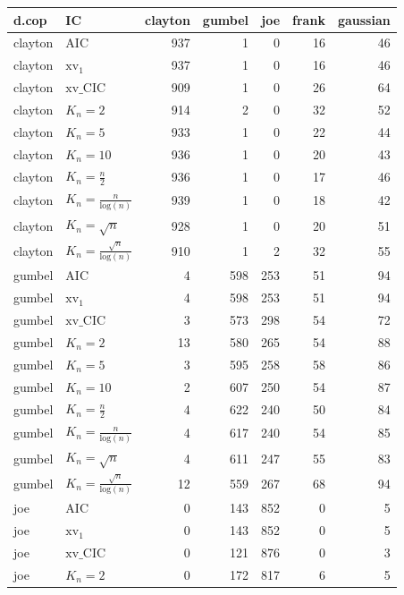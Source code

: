 \begin{table}[htbp]
\centering
\begin{tabular}{llrrrrr}
  \hline
d.cop & IC & clayton & gumbel & joe & frank & gaussian \\ 
  \hline
clayton & AIC & 937 & 1 & 0 & 16 & 46 \\ 
  clayton & $\text{xv}_{1}$ & 937 & 1 & 0 & 16 & 46 \\ 
  clayton & $\text{xv}\_\text{CIC}$ & 909 & 1 & 0 & 26 & 64 \\ 
  clayton & $K_{n}=2$ & 914 & 2 & 0 & 32 & 52 \\ 
  clayton & $K_{n}=5$ & 933 & 1 & 0 & 22 & 44 \\ 
  clayton & $K_{n}=10$ & 936 & 1 & 0 & 20 & 43 \\ 
  clayton & $K_{n}=\tfrac{n}{2}$ & 936 & 1 & 0 & 17 & 46 \\ 
  clayton & $K_{n}=\tfrac{n}{\text{log}(n)}$ & 939 & 1 & 0 & 18 & 42 \\ 
  clayton & $K_{n}=\sqrt{n}$ & 928 & 1 & 0 & 20 & 51 \\ 
  clayton & $K_{n}=\tfrac{\sqrt{n}}{\text{log}(n)}$ & 910 & 1 & 2 & 32 & 55 \\ 
   \hdashline
gumbel & AIC & 4 & 598 & 253 & 51 & 94 \\ 
  gumbel & $\text{xv}_{1}$ & 4 & 598 & 253 & 51 & 94 \\ 
  gumbel & $\text{xv}\_\text{CIC}$ & 3 & 573 & 298 & 54 & 72 \\ 
  gumbel & $K_{n}=2$ & 13 & 580 & 265 & 54 & 88 \\ 
  gumbel & $K_{n}=5$ & 3 & 595 & 258 & 58 & 86 \\ 
  gumbel & $K_{n}=10$ & 2 & 607 & 250 & 54 & 87 \\ 
  gumbel & $K_{n}=\tfrac{n}{2}$ & 4 & 622 & 240 & 50 & 84 \\ 
  gumbel & $K_{n}=\tfrac{n}{\text{log}(n)}$ & 4 & 617 & 240 & 54 & 85 \\ 
  gumbel & $K_{n}=\sqrt{n}$ & 4 & 611 & 247 & 55 & 83 \\ 
  gumbel & $K_{n}=\tfrac{\sqrt{n}}{\text{log}(n)}$ & 12 & 559 & 267 & 68 & 94 \\ 
   \hdashline
joe & AIC & 0 & 143 & 852 & 0 & 5 \\ 
  joe & $\text{xv}_{1}$ & 0 & 143 & 852 & 0 & 5 \\ 
  joe & $\text{xv}\_\text{CIC}$ & 0 & 121 & 876 & 0 & 3 \\ 
  joe & $K_{n}=2$ & 0 & 172 & 817 & 6 & 5 \\ 

\end{tabular}
\end{table}
